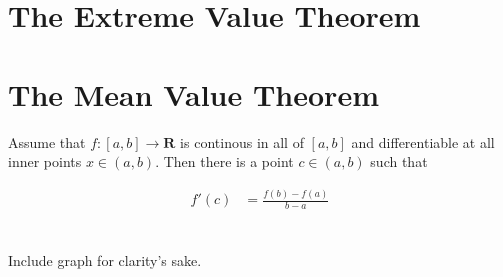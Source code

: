 \documentclass[12pt,letterpaper]{article}
\begin{document}
\section*{The Extreme Value Theorem}




\section*{The Mean Value Theorem}
Assume that $f : [a,b] \to \mathbf{R}$ is continous in all of $[a,b]$ and differentiable at all inner points $x \in (a,b)$. Then there is a point $c \in (a,b)$ such that 

\begin{align*}
	f'(c) &= \frac{f(b)-f(a)}{b-a} \\
\end{align*}

\noindent \\
Include graph for clarity's sake.


\end{document}
